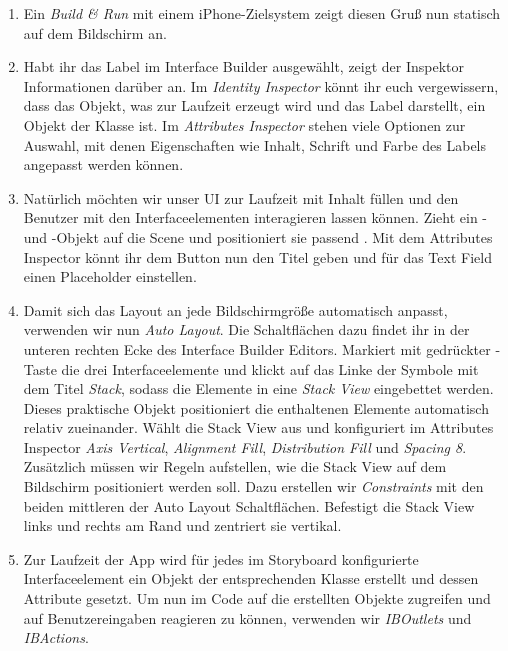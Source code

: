\documentclass[parskip=half, final]{scrreprt}
\begin{document}
\begin{lecture}
\begin{enumerate}
\item Ein \emph{Build \& Run} mit einem iPhone-Zielsystem zeigt diesen Gruß nun statisch auf dem Bildschirm an.

\item Habt ihr das Label im Interface Builder ausgewählt, zeigt der Inspektor Informationen darüber an. Im \emph{Identity Inspector} könnt ihr euch vergewissern, dass das Objekt, was zur Laufzeit erzeugt wird und das Label darstellt, ein Objekt der Klasse  ist. Im \emph{Attributes Inspector} stehen viele Optionen zur Auswahl, mit denen Eigenschaften wie Inhalt, Schrift und Farbe des Labels angepasst werden können.

\item Natürlich möchten wir unser UI zur Laufzeit mit Inhalt füllen und den Benutzer mit den Interfaceelementen interagieren lassen können. Zieht ein - und -Objekt auf die Scene und positioniert sie passend . Mit dem Attributes Inspector könnt ihr dem Button nun den Titel  geben und für das Text Field einen Placeholder  einstellen.


\item Damit sich das Layout an jede Bildschirmgröße automatisch anpasst, verwenden wir nun \emph{Auto Layout}. Die Schaltflächen dazu findet ihr in der unteren rechten Ecke des Interface Builder Editors. Markiert mit gedrückter \keys{\cmd}-Taste die drei Interfaceelemente und klickt auf das Linke der Symbole mit dem Titel \emph{Stack}, sodass die Elemente in eine \emph{Stack View} eingebettet werden. Dieses praktische Objekt positioniert die enthaltenen Elemente automatisch relativ zueinander. Wählt die Stack View aus und konfiguriert im Attributes Inspector \emph{Axis Vertical}, \emph{Alignment Fill}, \emph{Distribution Fill} und \emph{Spacing 8}. Zusätzlich müssen wir Regeln aufstellen, wie die Stack View auf dem Bildschirm positioniert werden soll. Dazu erstellen wir \emph{Constraints} mit den beiden mittleren der Auto Layout Schaltflächen. Befestigt die Stack View links und rechts am Rand und zentriert sie vertikal.

\item Zur Laufzeit der App wird für jedes im Storyboard konfigurierte Interfaceelement ein Objekt der entsprechenden Klasse erstellt und dessen Attribute gesetzt. Um nun im Code auf die erstellten Objekte zugreifen und auf Benutzereingaben reagieren zu können, verwenden wir \emph{IBOutlets} und \emph{IBActions}.
	

\end{enumerate}
\end{lecture}
\end{document}
